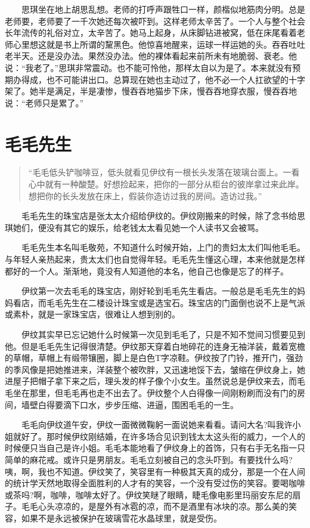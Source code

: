 \documentclass[12pt,UTF8]{ctexbook}
\begin{document}
　　思琪坐在地上胡思乱想。老师的打呼声跟牲口一样，颜楷似地筋肉分明。总是老师要，老师要了一千次她还每次被吓到。这样老师太辛苦了。一个人与整个社会长年流传的礼俗对立，太辛苦了。她马上起身，从床脚钻进被窝，低在床尾看着老师心里想这就是书上所谓的黧黑色。他惊喜地醒来，运球一样运她的头。吞吞吐吐老半天。还是没办法。果然没办法。他的裸体看起来前所未有地脆弱、衰老。他说：\enquote{我老了。}思琪非常震动。也不能可怜他，那样太自以为是了。本来就没有预期办得成，也不可能讲出口。总算现在她也主动过了，他不必一个人扛欲望的十字架了。她半是满足，半是凄惨，慢吞吞地猫步下床，慢吞吞地穿衣服，慢吞吞地说：\enquote{老师只是累了。}

\hypertarget{ux6bdbux6bdbux5148ux751f}{%
\section*{毛毛先生}\label{ux6bdbux6bdbux5148ux751f}}

\begin{quote}
\enquote{毛毛低头铲咖啡豆，低头就看见伊纹有一根长头发落在玻璃台面上。一看心中就有一种酸楚。好想捡起来，把你的一部分从柜台的彼岸拿过来此岸。想把你的长头发放在床上，假装你造访过我的房间。造访过我。}
\end{quote}

　　毛毛先生的珠宝店是张太太介绍给伊纹的。伊纹刚搬来的时候，除了念书给思琪她们，便没有其它的娱乐，给老钱太太看见她一个人读书又会被骂。

　　毛毛先生本名叫毛敬苑，不知道什么时候开始，上门的贵妇太太们叫他毛毛。与年轻人亲热起来，贵太太们也自觉得年轻。毛毛先生懂这心理，本来他就是怎样都好的一个人。渐渐地，竟没有人知道他的本名，他自己也像是忘了的样子。

　　伊纹第一次去毛毛的珠宝店，刚好轮到毛毛先生看店。一般总是毛毛先生的妈妈看店，而毛毛先生在二楼设计珠宝或是选宝石。珠宝店的门面倒也说不上是气派或素朴，就是一家珠宝店，很难让人想到别的。

　　伊纹其实早已忘记她什么时候第一次见到毛毛了，只是不知不觉间习惯要见到他。但是毛毛先生记得很清楚。伊纹那天穿着白地碎花的连身无袖洋装，戴着宽檐的草帽，草帽上有缎带镶圈，脚上是白色T字凉鞋。伊纹按了门铃，推开门，强劲的季风像是把她推进来，洋装整个被吹胖，又迅速地馁下去，皱缩在伊纹身上，她进屋子把帽子拿下来之后，理头发的样子像个小女生。虽然说总是伊纹来去，而毛毛坐在那里，但毛毛再也走不出去了。伊纹整个人白得像一间刚粉刷而没有门的房间，墙壁白得要滴下口水，步步压缩、进逼，围困毛毛的一生。

　　毛毛向伊纹道午安，伊纹一面微微鞠躬一面说她来看看。请问大名?叫我许小姐就好了。那时候伊纹刚结婚，在许多场合见识到钱太太这头衔的威力，一个人的时候便只当自己是许小姐。毛毛本能地看了伊纹身上的首饰，只有右手无名指一只简单的麻花戒。或许只是男朋友。毛毛立刻被自己的念头吓到。有要找什么吗?咦，啊，我也不知道。伊纹笑了，笑容里有一种极其天真的成分，那是一个在人间的统计学天然地取得全面胜利的人才有的笑容，一个没有受过伤的笑容。要喝咖啡或茶吗?啊，咖啡，咖啡太好了。伊纹笑瞇了眼睛，睫毛像电影里玛丽安东尼的扇子。毛毛心头凉凉的，是屋外有冰雹的凉，而不是酒里有冰块的凉。那么美的笑容，如果不是永远被保护在玻璃雪花水晶球里，就是受伤。
\end{document}
